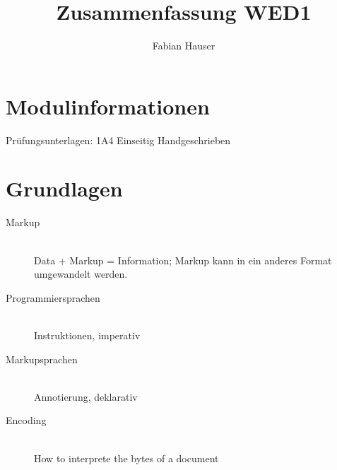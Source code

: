 

\title{Zusammenfassung WED1}
\author{Fabian Hauser}
 

\maketitle
\section{Modulinformationen}
Prüfungsunterlagen: 1A4 Einseitig Handgeschrieben

\section{Grundlagen}

\begin{description}
	
	\item[Markup] \hfill \\
		Data + Markup = Information; Markup kann in ein anderes Format umgewandelt werden.
		
	\item[Programmiersprachen] \hfill \\
		Instruktionen, imperativ
	\item[Markupsprachen] \hfill \\
		Annotierung, deklarativ
	\item[Encoding] \hfill \\
		How to interprete the bytes of a document
\end{description}
